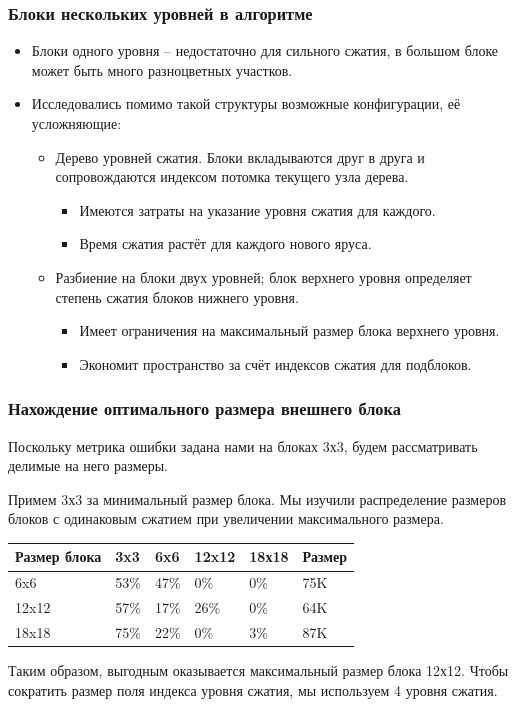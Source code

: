 \documentclass{beamer}
\begin{document}
\begin{frame}
\frametitle{Блоки нескольких уровней в алгоритме}

\begin{itemize}
\item Блоки одного уровня -- недостаточно для сильного сжатия, в большом блоке
  может быть много разноцветных участков.
\item Исследовались помимо такой структуры возможные конфигурации, её усложняющие:
  \begin{itemize}
  \item Дерево уровней сжатия. Блоки вкладываются друг в друга и сопровождаются
    индексом потомка текущего узла дерева.
    \begin{itemize}
    \item Имеются затраты на указание уровня сжатия для каждого.
    \item Время сжатия растёт для каждого нового яруса.
    \end{itemize}
  \item Разбиение на блоки двух уровней; блок верхнего уровня определяет степень
    сжатия блоков нижнего уровня.
    \begin{itemize}
    \item Имеет ограничения на максимальный размер блока верхнего уровня.
    \item Экономит пространство за счёт индексов сжатия для подблоков.
    \end{itemize}
  \end{itemize}
\end{itemize}

\end{frame}

\begin{frame}
\frametitle{Нахождение оптимального размера внешнего блока}

Поскольку метрика ошибки задана нами на блоках 3х3, будем рассматривать делимые
на него размеры.

Примем 3х3 за минимальный размер блока. Мы изучили распределение размеров блоков
с одинаковым сжатием при увеличении максимального размера.

\begin{center}
  \begin{tabu} {|l|l|l|l|l|l|}
    \hline
    Размер блока & 3x3 & 6x6 & 12x12 & 18х18 & Размер \\
    \hline
    6x6 & 53\% & 47\% & 0\% & 0\% & 75K \\
    12x12 & 57\% & 17\% & 26\% & 0\% & 64K \\
    18x18 & 75\% & 22\% & 0\% & 3\% & 87K \\
    \hline
  \end{tabu}
\end{center}

Таким образом, выгодным оказывается максимальный размер блока 12х12. Чтобы
сократить размер поля индекса уровня сжатия, мы используем 4 уровня сжатия.

\end{frame}
\end{document}
